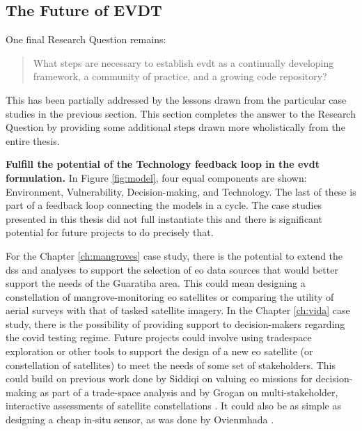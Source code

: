 \subsection{The Future of EVDT} \label{sec:future}

One final Research Question remains:

\blockquote{What steps are necessary to establish \ac{evdt} as a continually developing framework, a community of practice, and a growing code repository?}

This has been partially addressed by the lessons drawn from the particular case studies in the previous section. This section completes the answer to the Research Question by providing some additional steps drawn more wholistically from the entire thesis.

\textbf{Fulfill the potential of the Technology feedback loop in the \ac{evdt} formulation.} In Figure \ref{fig:model}, four equal components are shown: Environment, Vulnerability, Decision-making, and Technology. The last of these is part of a feedback loop connecting the models in a cycle. The case studies presented in this thesis did not full instantiate this and there is significant potential for future projects to do precisely that. 

For the Chapter \ref{ch:mangroves} case study, there is the potential to extend the \ac{dss} and analyses to support the selection of \ac{eo} data sources that would better support the needs of the Guaratiba area. This could mean designing a constellation of mangrove-monitoring \ac{eo} satellites or comparing the utility of aerial surveys with that of tasked satellite imagery. In the Chapter \ref{ch:vida} case study, there is the possibility of providing support to decision-makers regarding the \ac{covid} testing regime. Future projects could involve using tradespace exploration or other tools to support the design of a new \ac{eo} satellite (or constellation of satellites) to meet the needs of some set of stakeholders. This could build on previous work done by Siddiqi on valuing \ac{eo} missions for decision-making as part of a trade-space analysis \cite{siddiqiValuingNewEarth2019, siddiqiValuingRadiometricQuality2021} and by Grogan on multi-stakeholder, interactive assessments of satellite constellations \cite{groganMultistakeholderInteractiveSimulation2014, groganInteractiveSimulationGames2015}. It could also be as simple as designing a cheap in-situ sensor, as was done by Ovienmhada \cite{ovienmhadaEarthObservationTechnology2020}.

